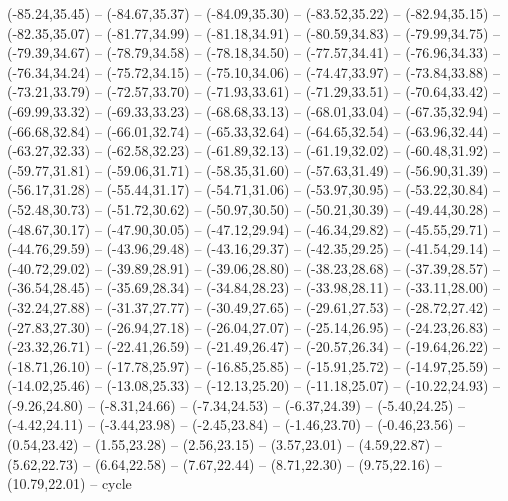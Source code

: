 {  (-85.24,35.45) -- (-84.67,35.37) -- (-84.09,35.30) -- (-83.52,35.22) -- (-82.94,35.15) -- (-82.35,35.07) -- (-81.77,34.99) --
  (-81.18,34.91) -- (-80.59,34.83) -- (-79.99,34.75) -- (-79.39,34.67) -- (-78.79,34.58) -- (-78.18,34.50) -- (-77.57,34.41) --
  (-76.96,34.33) -- (-76.34,34.24) -- (-75.72,34.15) -- (-75.10,34.06) -- (-74.47,33.97) -- (-73.84,33.88) -- (-73.21,33.79) --
  (-72.57,33.70) -- (-71.93,33.61) -- (-71.29,33.51) -- (-70.64,33.42) -- (-69.99,33.32) -- (-69.33,33.23) -- (-68.68,33.13) --
  (-68.01,33.04) -- (-67.35,32.94) -- (-66.68,32.84) -- (-66.01,32.74) -- (-65.33,32.64) -- (-64.65,32.54) -- (-63.96,32.44) --
  (-63.27,32.33) -- (-62.58,32.23) -- (-61.89,32.13) -- (-61.19,32.02) -- (-60.48,31.92) -- (-59.77,31.81) -- (-59.06,31.71) --
  (-58.35,31.60) -- (-57.63,31.49) -- (-56.90,31.39) -- (-56.17,31.28) -- (-55.44,31.17) -- (-54.71,31.06) -- (-53.97,30.95) --
  (-53.22,30.84) -- (-52.48,30.73) -- (-51.72,30.62) -- (-50.97,30.50) -- (-50.21,30.39) -- (-49.44,30.28) -- (-48.67,30.17) --
  (-47.90,30.05) -- (-47.12,29.94) -- (-46.34,29.82) -- (-45.55,29.71) -- (-44.76,29.59) -- (-43.96,29.48) -- (-43.16,29.37) --
  (-42.35,29.25) -- (-41.54,29.14) -- (-40.72,29.02) -- (-39.89,28.91) -- (-39.06,28.80) -- (-38.23,28.68) -- (-37.39,28.57) --
  (-36.54,28.45) -- (-35.69,28.34) -- (-34.84,28.23) -- (-33.98,28.11) -- (-33.11,28.00) -- (-32.24,27.88) -- (-31.37,27.77) --
  (-30.49,27.65) -- (-29.61,27.53) -- (-28.72,27.42) -- (-27.83,27.30) -- (-26.94,27.18) -- (-26.04,27.07) -- (-25.14,26.95) --
  (-24.23,26.83) -- (-23.32,26.71) -- (-22.41,26.59) -- (-21.49,26.47) -- (-20.57,26.34) -- (-19.64,26.22) -- (-18.71,26.10) --
  (-17.78,25.97) -- (-16.85,25.85) -- (-15.91,25.72) -- (-14.97,25.59) -- (-14.02,25.46) -- (-13.08,25.33) -- (-12.13,25.20) --
  (-11.18,25.07) -- (-10.22,24.93) -- (-9.26,24.80) -- (-8.31,24.66) -- (-7.34,24.53) -- (-6.37,24.39) -- (-5.40,24.25) --
  (-4.42,24.11) -- (-3.44,23.98) -- (-2.45,23.84) -- (-1.46,23.70) -- (-0.46,23.56) -- (0.54,23.42) -- (1.55,23.28) --
  (2.56,23.15) -- (3.57,23.01) -- (4.59,22.87) -- (5.62,22.73) -- (6.64,22.58) -- (7.67,22.44) -- (8.71,22.30) --
  (9.75,22.16) -- (10.79,22.01) -- cycle}
